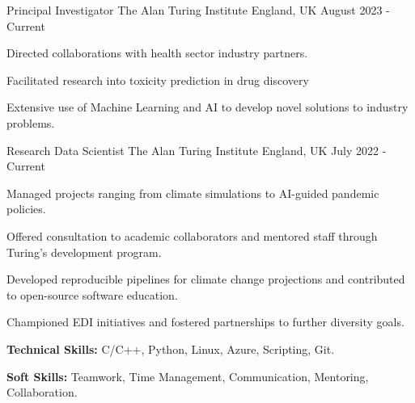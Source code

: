 
\begin{cventries}


  \cventry
    {Principal Investigator} %
    {The Alan Turing Institute} %
    {England, UK} %
    {August 2023 - Current} %
    {
      \begin{cvitems}
        \item {Directed collaborations with health sector industry partners.}
        \item {Facilitated research into toxicity prediction in drug discovery}
        \item {Extensive use of Machine Learning and AI to develop novel solutions to industry problems.}
      \end{cvitems}
    }

  \cventry
    {Research Data Scientist} %
    {The Alan Turing Institute} %
    {England, UK} %
    {July 2022 - Current} %
    {
      \begin{cvitems}
        \item {Managed projects ranging from climate simulations to AI-guided pandemic policies.}
        \item {Offered consultation to academic collaborators and mentored staff through Turing's development program.}
        \item {Developed reproducible pipelines for climate change projections and contributed to open-source software education.}
        \item {Championed EDI initiatives and fostered partnerships to further diversity goals.}
        \item {\textbf{Technical Skills:} C/C++, Python, Linux, Azure, Scripting, Git.}
        \item {\textbf{Soft Skills:} Teamwork, Time Management, Communication, Mentoring, Collaboration.}
      \end{cvitems}
    }


\end{cventries}
